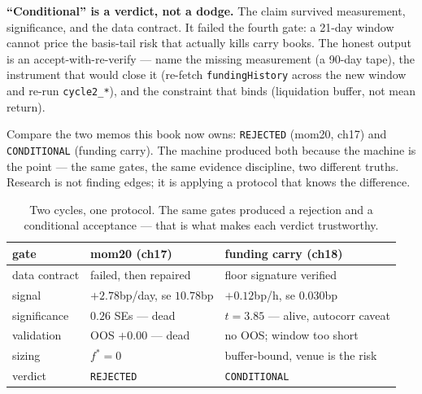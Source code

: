 \begin{example}\label{ex:memo18}
\textbf{``Conditional'' is a verdict, not a dodge.} The claim
survived measurement, significance, and the data contract. It
failed the fourth gate: a 21-day window cannot price the
basis-tail risk that actually kills carry books. The honest
output is an accept-with-re-verify --- name the missing
measurement (a 90-day tape), the instrument that would close
it (re-fetch \texttt{fundingHistory} across the new window and
re-run \texttt{cycle2\_*}), and the constraint that binds
(liquidation buffer, not mean return).
\begin{solution}
Compare the two memos this book now owns: \texttt{REJECTED}
(mom20, ch17) and \texttt{CONDITIONAL} (funding carry). The
machine produced both because the machine is the point ---
the same gates, the same evidence discipline, two different
truths. Research is not finding edges; it is applying a
protocol that knows the difference.
\end{solution}
\end{example}

\begin{table}[htbp]\centering\small
\begin{tabular}{lll}
\toprule
gate & mom20 (ch17) & funding carry (ch18)\\\midrule
data contract & failed, then repaired & floor signature verified\\
signal & $+2.78$bp/day, se $10.78$bp & $+0.12$bp/h, se $0.030$bp\\
significance & $0.26$ SEs --- dead & $t=3.85$ --- alive, autocorr caveat\\
validation & OOS $+0.00$ --- dead & no OOS; window too short\\
sizing & $f^*=0$ & buffer-bound, venue is the risk\\
verdict & \texttt{REJECTED} & \texttt{CONDITIONAL}\\
\bottomrule
\end{tabular}
\caption{Two cycles, one protocol. The same gates produced a
rejection and a conditional acceptance --- that is what makes
each verdict trustworthy.}
\label{tab:twocycles}
\end{table}

